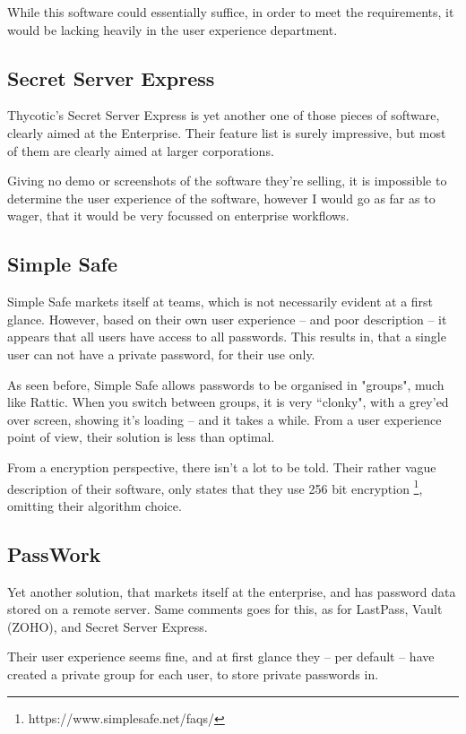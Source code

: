 			While this software could essentially suffice, in order to meet the requirements, it would be lacking heavily in the user experience department.



		\subsection{Secret Server Express}
			Thycotic's Secret Server Express is yet another one of those pieces of software, clearly aimed at the Enterprise. Their feature list is surely impressive, but most of them are clearly aimed at larger corporations. 

			Giving no demo or screenshots of the software they're selling, it is impossible to determine the user experience of the software, however I would go as far as to wager, that it would be very focussed on enterprise workflows.

		\subsection{Simple Safe}
			Simple Safe markets itself at teams, which is not necessarily evident at a first glance. However, based on their own user experience -- and poor description -- it appears that all users have access to all passwords. This results in, that a single user can not have a private password, for their use only.

			As seen before, Simple Safe allows passwords to be organised in "groups", much like Rattic. When you switch between groups, it is very ``clonky", with a grey'ed over screen, showing it's loading -- and it takes a while. From a user experience point of view, their solution is less than optimal.

			From a encryption perspective, there isn't a lot to be told. Their rather vague description of their software, only states that they use 256 bit encryption \footnote{https://www.simplesafe.net/faqs/}, omitting their algorithm choice.


		\subsection{PassWork}
			Yet another solution, that markets itself at the enterprise, and has password data stored on a remote server. Same comments goes for this, as for LastPass, Vault (ZOHO), and Secret Server Express. 

			Their user experience seems fine, and at first glance they -- per default -- have created a private group for each user, to store private passwords in. 

